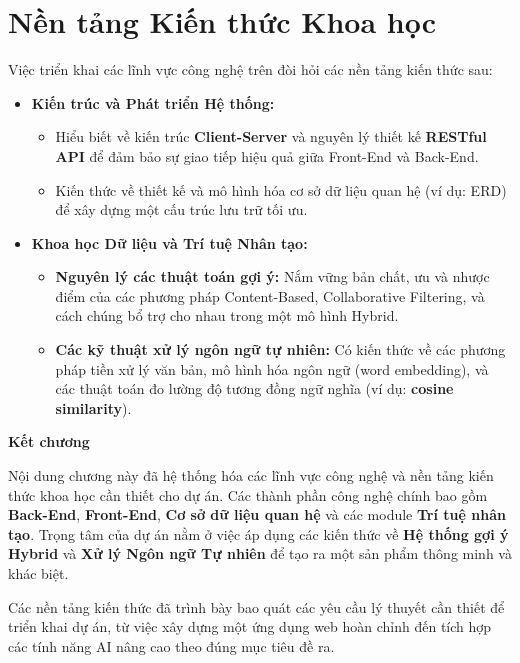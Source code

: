 \section{Nền tảng Kiến thức Khoa học}

Việc triển khai các lĩnh vực công nghệ trên đòi hỏi các nền tảng kiến thức sau:

\begin{itemize}
    \item \textbf{Kiến trúc và Phát triển Hệ thống:}
    \begin{itemize}
        \item Hiểu biết về kiến trúc \textbf{Client-Server} và nguyên lý thiết kế \textbf{RESTful API} để đảm bảo sự giao tiếp hiệu quả giữa Front-End và Back-End.
        \item Kiến thức về thiết kế và mô hình hóa cơ sở dữ liệu quan hệ (ví dụ: ERD) để xây dựng một cấu trúc lưu trữ tối ưu.
    \end{itemize}

    \item \textbf{Khoa học Dữ liệu và Trí tuệ Nhân tạo:}
    \begin{itemize}
        \item \textbf{Nguyên lý các thuật toán gợi ý:} Nắm vững bản chất, ưu và nhược điểm của các phương pháp Content-Based, Collaborative Filtering, và cách chúng bổ trợ cho nhau trong một mô hình Hybrid.
        \item \textbf{Các kỹ thuật xử lý ngôn ngữ tự nhiên:} Có kiến thức về các phương pháp tiền xử lý văn bản, mô hình hóa ngôn ngữ (word embedding), và các thuật toán đo lường độ tương đồng ngữ nghĩa (ví dụ: \textbf{cosine similarity}).
    \end{itemize}
\end{itemize}

\textbf{Kết chương}

Nội dung chương này đã hệ thống hóa các lĩnh vực công nghệ và nền tảng kiến thức khoa học cần thiết cho dự án. Các thành phần công nghệ chính bao gồm \textbf{Back-End}, \textbf{Front-End}, \textbf{Cơ sở dữ liệu quan hệ} và các module \textbf{Trí tuệ nhân tạo}. Trọng tâm của dự án nằm ở việc áp dụng các kiến thức về \textbf{Hệ thống gợi ý Hybrid} và \textbf{Xử lý Ngôn ngữ Tự nhiên} để tạo ra một sản phẩm thông minh và khác biệt.

Các nền tảng kiến thức đã trình bày bao quát các yêu cầu lý thuyết cần thiết để triển khai dự án, từ việc xây dựng một ứng dụng web hoàn chỉnh đến tích hợp các tính năng AI nâng cao theo đúng mục tiêu đề ra.
